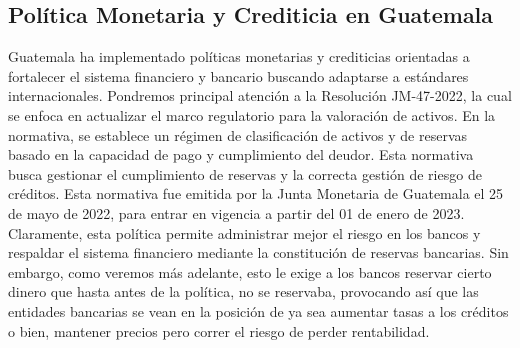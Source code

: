 

%

\subsection{Política Monetaria y Crediticia en Guatemala}
Guatemala ha implementado políticas monetarias y crediticias orientadas a fortalecer el sistema financiero y bancario  buscando adaptarse a estándares internacionales. Pondremos principal atención a la Resolución JM-47-2022, la cual se enfoca en actualizar el marco regulatorio para la valoración de activos. En la normativa, se establece un régimen de clasificación de activos y de reservas basado en la capacidad de pago y cumplimiento del deudor. Esta normativa busca gestionar el cumplimiento de reservas y la correcta gestión de riesgo de créditos. Esta normativa fue emitida por la Junta Monetaria de Guatemala el 25 de mayo de 2022, para entrar en vigencia a partir del 01 de enero de 2023. Claramente, esta política permite administrar mejor el riesgo en los bancos y respaldar el sistema financiero mediante la constitución de reservas bancarias. Sin embargo, como veremos más adelante, esto le exige a los bancos reservar cierto dinero que hasta antes de la política, no se reservaba, provocando así que las entidades bancarias se vean en la posición de ya sea aumentar tasas a los créditos o bien, mantener precios pero correr el riesgo de perder rentabilidad.

